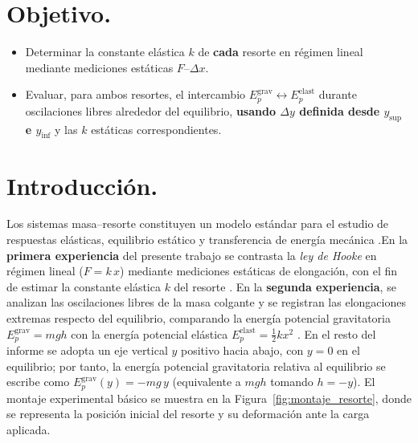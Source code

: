 \documentclass[11pt,twocolumn]{article}
\makeatletter
\let\orig@cite\cite
\renewcommand{\cite}[1]{\textcolor{Blue}{\orig@cite{#1}}}
\let\orig@parencite\parencite
\renewcommand{\parencite}[1]{\textcolor{Blue}{\orig@parencite{#1}}}
\renewcommand{\cite}[1]{\parencite{#1}}      %
\let\orig@cite\cite
\renewcommand{\cite}[1]{\textcolor{Blue}{\orig@cite{#1}}} %
\makeatother
\begin{document}

\section{Objetivo.}

\begin{itemize}
    \item Determinar la constante elástica $k$ de \textbf{cada} resorte en régimen lineal mediante mediciones estáticas $F$–$\Delta x$. 
    \item Evaluar, para ambos resortes, el intercambio $E_p^{\text{grav}}\leftrightarrow E_p^{\text{elast}}$ durante oscilaciones libres alrededor del equilibrio, \textbf{usando $\Delta y$ definida desde $y_{\text{sup}}$ e $y_{\text{inf}}$} y las $k$ estáticas correspondientes.

\end{itemize}

\section{Introducción.}

Los sistemas masa–resorte constituyen un modelo estándar para el estudio de respuestas elásticas, equilibrio estático y transferencia de energía mecánica \cite{HallidayResnick}.En la \textbf{primera experiencia} del presente trabajo se contrasta la \emph{ley de Hooke} en régimen lineal ($F = k\,x$) mediante mediciones estáticas de elongación, con el fin de estimar la constante elástica $k$ del resorte \cite{SerwayHooke}. En la \textbf{segunda experiencia}, se analizan las oscilaciones libres de la masa colgante y se registran las elongaciones extremas respecto del equilibrio, comparando la energía potencial gravitatoria $E_p^{\text{grav}} = mgh$ con la energía potencial elástica $E_p^{\text{elast}} = \tfrac{1}{2}kx^2$ \cite{TiplerEnergia, FeynmanLectures}. En el resto del informe se adopta un eje vertical $y$ positivo hacia abajo, con $y=0$ en el equilibrio; por tanto, la energía potencial gravitatoria relativa al equilibrio se escribe como $E_p^{\text{grav}}(y)=-mg\,y$ (equivalente a $mgh$ tomando $h=-y$). El montaje experimental básico se muestra en la Figura~\ref{fig:montaje_resorte}, donde se representa la posición inicial del resorte y su deformación ante la carga aplicada.

\end{document}
